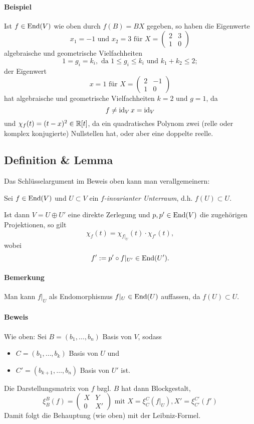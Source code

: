\paragraph{Beispiel}
	Ist $ f\in\operatorname{End}(V) $ wie oben durch $ f(B)=BX $ gegeben, so haben die Eigenwerte
		\[ x_1 = -1 \text{ und } x_2 = 3 \text{ für }
		X=\begin{pmatrix} 2 &3\\1 & 0 \end{pmatrix} \]
	algebraische und geometrische Vielfachheiten 
		\[ 1 = g_i = k_i, \text{ da } 1\leq g_i \leq k_i \text{ und } k_1+k_2 \leq 2; \]
	der Eigenwert
		\[ x=1 \text{ für } X = \begin{pmatrix} 2&-1\\1&0 \end{pmatrix} \]
	hat algebraische und geometrische Vielfachheiten $ k = 2 \text{ und } g = 1 $, da
		\[ f\neq \operatorname{id}_V x = \operatorname{id}_V \]
	und $ \chi_f(t)=(t-x)^2 \in \mathbb{R}[t] $, da ein quadratisches Polynom zwei (relle oder komplex konjugierte) Nullstellen hat, oder aber eine doppelte reelle.

\subsection{Definition \& Lemma}
	Das Schlüsselargument im Beweis oben kann man verallgemeinern:\\
\begin{Definition}
	Sei $ f\in \operatorname{End}(V) $ und $ U\subset V $ ein \emph{$ f $-invarianter Unterraum}, d.h. $ f(U)\subset U $. 
\end{Definition}
\begin{Lemma}[]
	Ist dann $ V=U\oplus U' $ eine direkte Zerlegung und $ p,p'\in \operatorname{End}(V) $ die zugehörigen Projektionen, so gilt
		\[ \chi_f(t)=\chi_{f|_U}(t)\cdot \chi_{f'}(t), \]
	wobei
		\[ f':= p'\circ f|_{U'}\in \operatorname{End}(U'). \]

\end{Lemma}
\paragraph{Bemerkung}
	Man kann $ f|_U $ als Endomorphismus $ f|_U\in \operatorname{End}(U) $ auffassen, da $ f(U)\subset U $.
\paragraph{Beweis}
	Wie oben: Sei $ B=(b_1,\dots,b_n) $ Basis von $ V $, sodass
		\begin{itemize}
			\item $ C=(b_1,\dots,b_k) $ Basis von $ U $ und
			\item $ C'=(b_{k+1},\dots,b_n) $ Basis von $ U' $ ist.
		\end{itemize}
	Die Darstellungsmatrix von $ f $ bzgl. $ B $ hat dann Blockgestalt,
		\[ \xi_B^B(f) =
			\begin{pmatrix}
				X&Y\\0&X'
			\end{pmatrix}
		\text{ mit } X=\xi_C^C(f|_U), X' = \xi_{C'}^{C'}(f') \]
	Damit folgt die Behauptung (wie oben) mit der Leibniz-Formel.
